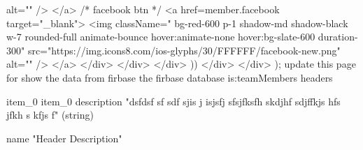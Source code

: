 {{                              alt=""
                           />
                        </a>
                        {/* facebook btn */}
                        <a href={member.facebook} target="_blank">
                           <img
                              className=" bg-red-600 p-1 shadow-md shadow-black  w-7 rounded-full animate-bounce hover:animate-none hover:bg-slate-600 duration-300"
                              src="https://img.icons8.com/ios-glyphs/30/FFFFFF/facebook-new.png"
                              alt=""
                           />
                        </a>
                     </div>
                  </div>
               </div>
            ))}
         </div>
      </div>
   );
}
update this page for show the data from firbase 
the firbase database is:teamMembers
headers

item_0
item_0
description
"dsfdsf sf sdf sjis j isjsfj sfsjfksfh skdjhf sdjffkjs hfs jfkh s kfjs f"
(string)


name
"Header Description"